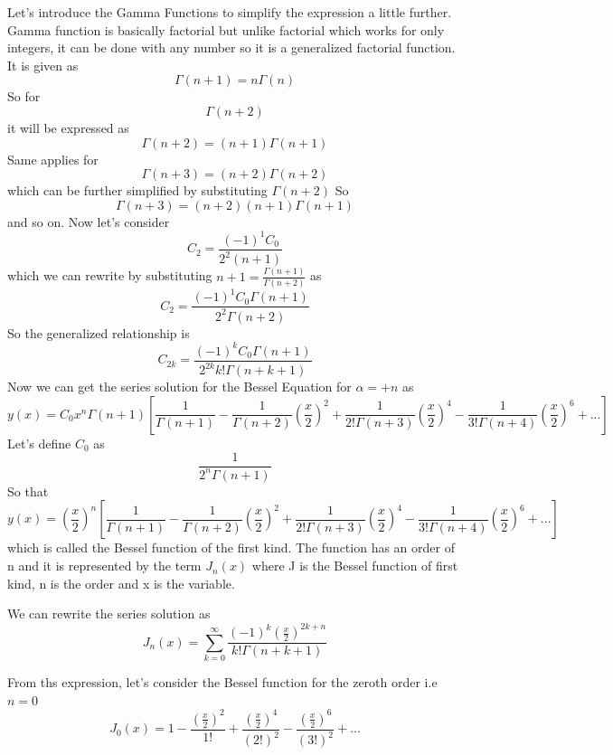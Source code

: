 Let's introduce the Gamma Functions to simplify the expression a little further. Gamma function is basically factorial but unlike factorial which works for only integers, it can be done with any number so it is a generalized factorial function. It is given as 
$$\Gamma(n + 1) = n \Gamma(n)$$
So for $$\Gamma(n + 2)$$ it will be expressed as $$\Gamma(n + 2) = (n + 1)\Gamma(n + 1)$$
Same applies for $$\Gamma(n + 3) = (n + 2)\Gamma(n + 2)$$ which can be further simplified by substituting $\Gamma(n + 2)$
So   $$\Gamma(n + 3) = (n + 2)(n + 1)\Gamma(n + 1)$$ and so on.
Now let's consider
$$C_2 = \frac{(-1)^1 C_0}{2^2(n + 1)}$$
which we can rewrite by substituting $ n + 1 = \frac{\Gamma(n + 1)}{\Gamma(n + 2)}$ as 
$$C_2 = \frac{(-1)^1 C_0 \Gamma(n + 1)}{2^2 \Gamma(n + 2)}$$
So the generalized relationship is 
$$C_{2k} =  \frac{(-1)^k C_0 \Gamma(n + 1)}{2^{2k} k! \Gamma(n + k + 1)}$$
Now we can get the series solution for the Bessel Equation for $\alpha= +n$ as 
\begin{dmath*}
y(x) = C_0 x^n \Gamma(n + 1) \left[\frac{1}{\Gamma(n + 1)} - \frac{1}{\Gamma(n+2)}\left(\frac{x}{2}\right)^2 +\frac{1}{2!\Gamma(n+3)}\left(\frac{x}{2}\right)^4 - \frac{1}{3!\Gamma(n+4)}\left(\frac{x}{2}\right)^6 + ... \right]
\end{dmath*}
Let's define $C_0$ as $$\frac{1}{2^n \Gamma(n + 1)}$$ So that
\begin{dmath*}
y(x) = (\frac{x}{2})^n \left[\frac{1}{\Gamma(n + 1)} - \frac{1}{\Gamma(n+2)}\left(\frac{x}{2}\right)^2 +\frac{1}{2!\Gamma(n+3)}\left(\frac{x}{2}\right)^4 - \frac{1}{3!\Gamma(n+4)}\left(\frac{x}{2}\right)^6 + ... \right]
\end{dmath*}
which is called the Bessel function of the first kind. The function has an order of n and it is represented by the term $J_n(x)$
where J is the Bessel function of first kind, n is the order and x is the variable.

We can rewrite the series solution as 
$$J_n(x) = \sum_{k = 0}^{\infty}\frac{(-1)^k (\frac{x}{2})^{2k + n}}{k! \Gamma(n + k + 1)}$$

From ths expression, let's consider the Bessel function for the zeroth order i.e $n=0$
$$J_0(x) = 1 - \frac{(\frac{x}{2})^2 }{1!} + \frac{(\frac{x}{2})^4 }{(2!)^2} - \frac{(\frac{x}{2})^6 }{(3!)^2} + ...$$

